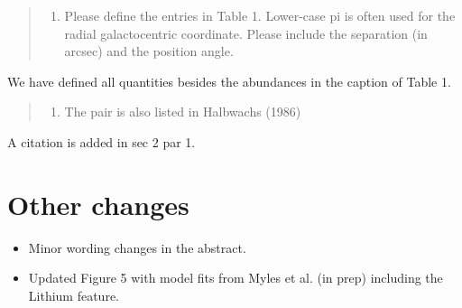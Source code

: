 \documentclass[12pt]{article}
\begin{document}
\begin{quote}
\begin{enumerate}
\def\labelenumi{\arabic{enumi}.}
\setcounter{enumi}{1}
\itemsep1pt\parskip0pt
\item
  Please define the entries in Table 1. Lower-case pi is often used for
  the radial galactocentric coordinate. Please include the separation
  (in arcsec) and the position angle.
\end{enumerate}
\end{quote}
We have defined all quantities besides the abundances in the caption of Table 1.

\begin{quote}
\begin{enumerate}
\def\labelenumi{\arabic{enumi}.}
\setcounter{enumi}{2}
\itemsep1pt\parskip0pt
\item
  The pair is also listed in Halbwachs (1986)
\end{enumerate}
\end{quote}
A citation is added in sec 2 par 1.

\section*{Other changes}
\label{sec:other}

\begin{itemize}
\item Minor wording changes in the abstract.
\item Updated Figure 5 with model fits from Myles et al. (in prep) including the
  Lithium feature.
\end{itemize}

%

\end{document}
